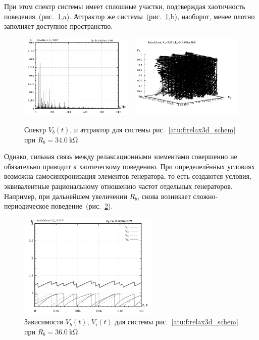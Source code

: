 При этом спектр системы имеет сплошные участки, подтверждая
хаотичность поведения~(рис.~\ref{atu:f:relax3d_f_08},a).
Аттрактор же системы~(рис.~\ref{atu:f:relax3d_f_08},b),
наоборот, менее плотно заполняет доступное пространство.

\begin{figure}[htb!]
  \centerline{
    \includegraphics[width=0.48\textwidth]{p/relax3d_f_08.png}
    ~
    \includegraphics[width=0.48\textwidth]{p/relax3d_v1v2v3_08.png}
  }
  \caption{Спектр $V_b(t)$, и аттрактор для системы рис.~\ref{atu:f:relax3d_schem} при $R_b=\SI{34.0}{\kilo\ohm}$ }
  \label{atu:f:relax3d_f_08}
\end{figure}

Однако, сильная связь между релаксационными элементами
совершенно не обязательно приводит к хаотическому поведению.
При определелённых условиях возможна самосинхронизация
элементов генератора, то есть создаются условия,
эквивалентные рациональному отношению частот отдельных генераторов.
Например, при дальнейшем увеличении $R_b$, снова
возникает сложно-периодическое поведение~(рис.~\ref{atu:f:relax3d_t_09}).

\begin{figure}[htb!]
  \centerline{\includegraphics[width=0.6\textwidth]{p/relax3d_t_09.png} }
  \caption{Зависимости $V_b(t)$, $V_i(t)$ для системы рис.~\ref{atu:f:relax3d_schem} при $R_b=\SI{36.0}{\kilo\ohm}$ }
  \label{atu:f:relax3d_t_09}
\end{figure}

